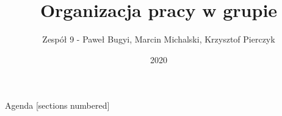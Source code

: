 \documentclass[12pt]{beamer}
\title{Organizacja pracy w grupie}
\date{2020}
\author{Zespół 9 - Paweł Bugyi, Marcin Michalski, Krzysztof Pierczyk}
\institute{Projektowanie układów sterowania (projekt grupowy)}
\begin{document}
\maketitle

\begin{frame}{Agenda}
  [sections numbered]
  \tableofcontents[hideallsubsections]
\end{frame}





\end{document}
